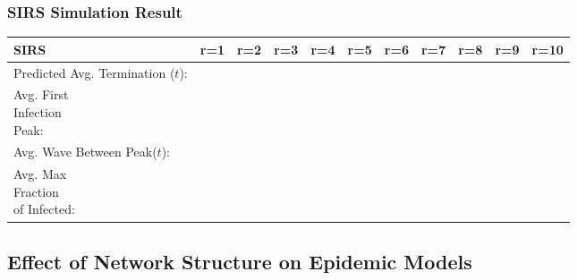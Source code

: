 \documentclass{subfile}
\begin{document}
  \subsubsection{SIRS Simulation Result}
  \begin{adjustbox}{max width=1.2\textwidth,center}
    \begin{tabular}{|l|l|l|l|l|l|l|l|l|l|l|}
      \hline
      SIRS & r=1 & r=2 & r=3 & r=4 & r=5 & r=6 & r=7 & r=8 & r=9& r=10\\
      \hline
      \makecell{Predicted\\Avg.\\Termination\\(\(t\)):}\\
      \hline
      \makecell{Avg. First\\Infection\\Peak:}\\
      \hline
      \makecell{Avg. Wave\\Between Peak(\(t\)):}\\
      \hline
      \makecell{Avg. Max\\Fraction\\of Infected:}\\
      \hline
    \end{tabular}
  \end{adjustbox}

  \subsection{Effect of Network Structure on Epidemic Models}
\end{document}
